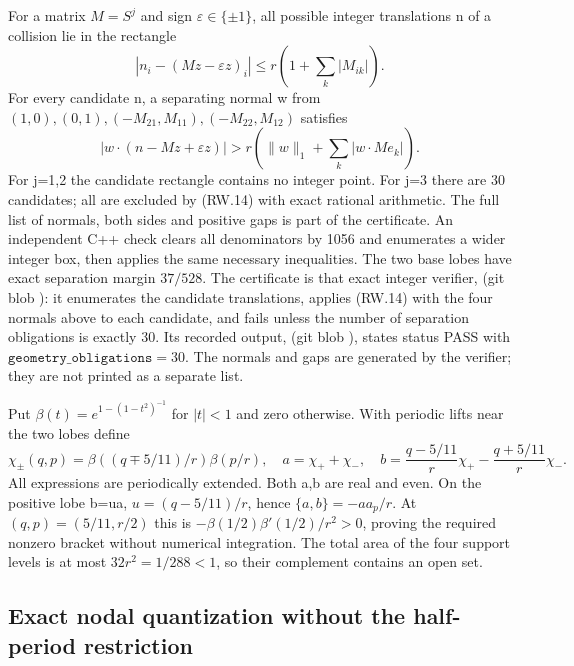 For a matrix \(M=S^j\) and sign \(\varepsilon\in\{\pm1\}\), all possible integer translations n of a collision lie in the rectangle \[
 |n_i-(Mz-\varepsilon z)_i|
 \leq r\left(1+\sum_k|M_{ik}|\right).
\] For every candidate n, a separating normal w from \((1,0),(0,1),(-M_{21},M_{11}),(-M_{22},M_{12})\) satisfies \[
 |w\cdot(n-Mz+\varepsilon z)|
 >r\left(\|w\|_1+\sum_k|w\cdot M e_k|\right).              \tag{RW.14}
\] For j=1,2 the candidate rectangle contains no integer point. For j=3 there are 30 candidates; all are excluded by (RW.14) with exact rational arithmetic. The full list of normals, both sides and positive gaps is part of the certificate. An independent C++ check clears all denominators by 1056 and enumerates a wider integer box, then applies the same necessary inequalities. The two base lobes have exact separation margin \(37/528\). The certificate is that exact integer verifier,  (git blob ): it enumerates the candidate translations, applies (RW.14) with the four normals above to each candidate, and fails unless the number of separation obligations is exactly \(30\). Its recorded output,  (git blob ), states status PASS with \(\texttt{geometry\_obligations}=30\). The normals and gaps are generated by the verifier; they are not printed as a separate list.

Put \(\beta(t)=e^{1-(1-t^2)^{-1}}\) for \(|t|<1\) and zero otherwise. With periodic lifts near the two lobes define \[
 \chi_\pm(q,p)=\beta((q\mp5/11)/r)\beta(p/r),\quad
 a=\chi_++\chi_-,\quad
 b=\frac{q-5/11}{r}\chi_+-\frac{q+5/11}{r}\chi_-.            \tag{RW.15}
\] All expressions are periodically extended. Both a,b are real and even. On the positive lobe b=ua, \(u=(q-5/11)/r\), hence \(\{a,b\}=-a a_p/r\). At \((q,p)=(5/11,r/2)\) this is \(-\beta(1/2)\beta'(1/2)/r^2>0\), proving the required nonzero bracket without numerical integration. The total area of the four support levels is at most \(32r^2=1/288<1\), so their complement contains an open set.

\subsection{Exact nodal quantization without the half-period restriction}\label{return_words:exact-nodal-quantization-without-the-half-period-restriction}

